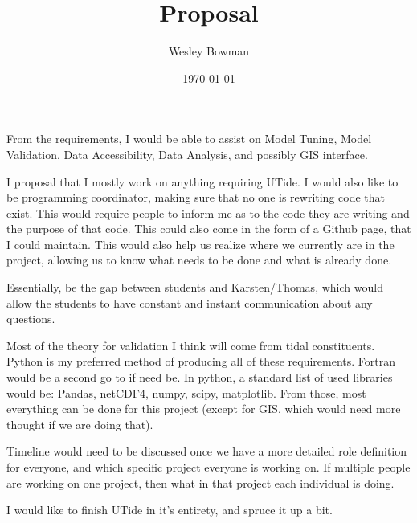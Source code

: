 \documentclass[12pt]{article}
\theoremstyle{definition}
\begin{document}
\title{Proposal}
\author{Wesley Bowman}
\date{\today}
\maketitle

    From the requirements, I would be able to assist on Model Tuning, Model
    Validation, Data Accessibility, Data Analysis, and possibly GIS interface.

    I proposal that I mostly work on anything requiring UTide. I would also
    like to be programming coordinator, making sure that no one is rewriting
    code that exist. This would require people to inform me as to the code they
    are writing and the purpose of that code. This could also come in the form
    of a Github page, that I could maintain. This would also help us realize
    where we currently are in the project, allowing us to know what needs to be
    done and what is already done.

    Essentially, be the gap between students and Karsten/Thomas, which would
    allow the students to have constant and instant
    communication about any questions.

    Most of the theory for validation I think will come from tidal
    constituents. Python is my preferred method of producing all of these
    requirements. Fortran would be a second go to if need be. In python, a
    standard list of used libraries would be:
    Pandas, netCDF4, numpy, scipy, matplotlib. From those, most everything can
    be done for this project (except for GIS, which would need more thought if
    we are doing that).

    Timeline would need to be discussed once we have a more detailed role
    definition for everyone, and which specific project everyone is working on.
    If multiple people are working on one project, then what in that project
    each individual is doing.

    I would like to finish UTide in it's entirety, and spruce it up a bit.



\end{document}
